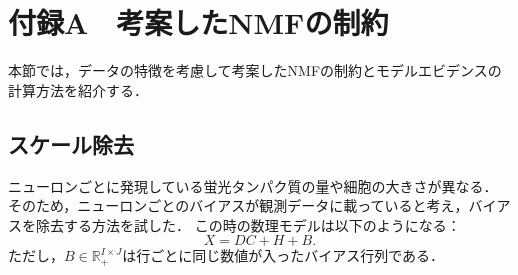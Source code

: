 \chapter{付録A　考案したNMFの制約}
本節では，データの特徴を考慮して考案したNMFの制約とモデルエビデンスの計算方法を紹介する．

% 
% 
\section{スケール除去}
ニューロンごとに発現している蛍光タンパク質の量や細胞の大きさが異なる．
そのため，ニューロンごとのバイアスが観測データに載っていると考え，バイアスを除去する方法を試した．
この時の数理モデルは以下のようになる：
\begin{equation}
	X = DC + H + B.
\end{equation}
ただし，$B \in \mathbb{R}_+^{I\times J}$は行ごとに同じ数値が入ったバイアス行列である．

